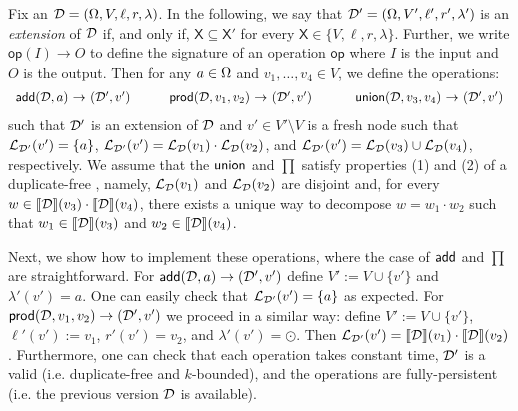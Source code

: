 Fix an \dsabbr{} $\mathcal{D} = (\Omega, V, \ell, r, \lambda)$. In the following, we say that $\mathcal{D}' = (\Omega, V', \ell', r', \lambda')$ is an \emph{extension} of $\mathcal{D}$ if, and only if, $\mathsf{X} \subseteq \mathsf{X}'$ for every $\mathsf{X} \in \{V, \ell, r, \lambda\}$. Further, we write $\mathsf{op}(I) \rightarrow O$ to define the signature of an operation $\mathsf{op}$ where $I$ is the input and $O$ is the output. 
Then for any $a \in \Omega$ and $v_1, \ldots, v_4 \in V$, we define the operations:
\[
\begin{array}{rclrclrcl}
\add(\D,a) & \!\!\!\!\rightarrow\!\!\!\! & (\D',v')   \ \ \ \ \ \	 & \prod(\D,v_1, v_2) & \!\!\!\! \rightarrow \!\!\!\! & (\D',v')   \ \ \ \ \ \ \ &  \union(\D,v_3, v_4) & \!\!\!\!\rightarrow\!\!\!\! & (\D',v')
\end{array}
\]
\noindent such that $\mathcal{D}'$ is an extension of $\mathcal{D}$  and $v' \in V' \setminus V$ is a fresh node such that $\mathcal{L}_{\mathcal{D}'}(v') = \{a\}$, $\mathcal{L}_{\mathcal{D}'}(v') = \mathcal{L}_{\mathcal{D}}(v_1) \cdot \mathcal{L}_{\mathcal{D}}(v_2)$, and $\mathcal{L}_{\mathcal{D}'}(v') = \mathcal{L}_{\mathcal{D}}(v_3) \cup \mathcal{L}_{\mathcal{D}}(v_4)$, respectively.
We assume that the $\mathsf{union}$ and $\prod$ satisfy properties (1) and (2) of a duplicate-free \dsabbr{}, namely, $\mathcal{L}_{\mathcal{D}}(v_1)$ and $\mathcal{L}_{\mathcal{D}}(v_2)$ are disjoint and, for every $w \in {\llbracket{\mathcal{D}}\rrbracket}(v_3) \cdot {\llbracket{\mathcal{D}}\rrbracket}(v_4)$, there exists a unique way to decompose $w = w_1 \cdot w_2$ such that $w_1 \in {\llbracket{\mathcal{D}}\rrbracket}(v_3)$ and $w_2 \in {\llbracket{\mathcal{D}}\rrbracket}(v_4)$. 


Next, we show how to implement these operations, where the case of $\mathsf{add}$ and $\prod$ are straightforward. For $ \mathsf{add}(\mathcal{D},a) \rightarrow (\mathcal{D}',v')$ define $V' := V \cup \{v'\}$ and $\lambda'(v') = a$. One can easily check that $\mathcal{L}_{\mathcal{D}'}(v') = \{a\}$ as expected. For $\mathsf{prod}(\mathcal{D},v_1, v_2) \rightarrow (\mathcal{D}',v')$ we proceed in a similar way: define $V' := V \cup\{v'\}$, $\ell'(v') :=v_1$, $r'(v') = v_2$, and $\lambda'(v') = \odot$. 
Then $\mathcal{L}_{\mathcal{D}'}(v') = {\llbracket{\mathcal{D}}\rrbracket}(v_1)\cdot{\llbracket{\mathcal{D}}\rrbracket}(v_2)$.
Furthermore, one can check that each operation takes constant time, $\mathcal{D}'$ is a valid \dsabbr{} (i.e. duplicate-free and $k$-bounded), and the operations are fully-persistent (i.e. the previous version $\mathcal{D}$ is available).

